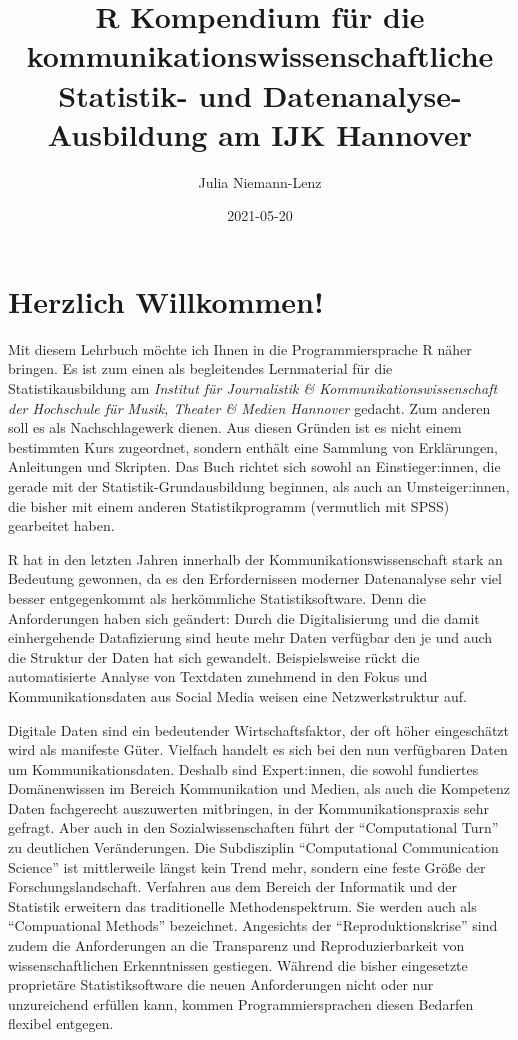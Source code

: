 \documentclass[
]{book}
\title{R Kompendium für die kommunikationswissenschaftliche Statistik- und Datenanalyse-Ausbildung am IJK Hannover}
\author{Julia Niemann-Lenz}
\date{2021-05-20}
\begin{document}
\maketitle

{
\setcounter{tocdepth}{1}
\tableofcontents
}
\hypertarget{herzlich-willkommen}{%
\chapter*{Herzlich Willkommen!}\label{herzlich-willkommen}}

Mit diesem Lehrbuch möchte ich Ihnen in die Programmiersprache R näher bringen. Es ist zum einen als begleitendes Lernmaterial für die Statistikausbildung am \emph{Institut für Journalistik \& Kommunikationswissenschaft der Hochschule für Musik, Theater \& Medien Hannover} gedacht. Zum anderen soll es als Nachschlagewerk dienen. Aus diesen Gründen ist es nicht einem bestimmten Kurs zugeordnet, sondern enthält eine Sammlung von Erklärungen, Anleitungen und Skripten. Das Buch richtet sich sowohl an Einstieger:innen, die gerade mit der Statistik-Grundausbildung beginnen, als auch an Umsteiger:innen, die bisher mit einem anderen Statistikprogramm (vermutlich mit SPSS) gearbeitet haben.

R hat in den letzten Jahren innerhalb der Kommunikationswissenschaft stark an Bedeutung gewonnen, da es den Erfordernissen moderner Datenanalyse sehr viel besser entgegenkommt als herkömmliche Statistiksoftware. Denn die Anforderungen haben sich geändert: Durch die Digitalisierung und die damit einhergehende Datafizierung sind heute mehr Daten verfügbar den je und auch die Struktur der Daten hat sich gewandelt. Beispielsweise rückt die automatisierte Analyse von Textdaten zunehmend in den Fokus und Kommunikationsdaten aus Social Media weisen eine Netzwerkstruktur auf.

Digitale Daten sind ein bedeutender Wirtschaftsfaktor, der oft höher eingeschätzt wird als manifeste Güter. Vielfach handelt es sich bei den nun verfügbaren Daten um Kommunikationsdaten. Deshalb sind Expert:innen, die sowohl fundiertes Domänenwissen im Bereich Kommunikation und Medien, als auch die Kompetenz Daten fachgerecht auszuwerten mitbringen, in der Kommunikationspraxis sehr gefragt. Aber auch in den Sozialwissenschaften führt der ``Computational Turn'' zu deutlichen Veränderungen. Die Subdisziplin ``Computational Communication Science'' ist mittlerweile längst kein Trend mehr, sondern eine feste Größe der Forschungslandschaft. Verfahren aus dem Bereich der Informatik und der Statistik erweitern das traditionelle Methodenspektrum. Sie werden auch als ``Compuational Methods'' bezeichnet. Angesichts der ``Reproduktionskrise'' sind zudem die Anforderungen an die Transparenz und Reproduzierbarkeit von wissenschaftlichen Erkenntnissen gestiegen. Während die bisher eingesetzte proprietäre Statistiksoftware die neuen Anforderungen nicht oder nur unzureichend erfüllen kann, kommen Programmiersprachen diesen Bedarfen flexibel entgegen.
\end{document}
